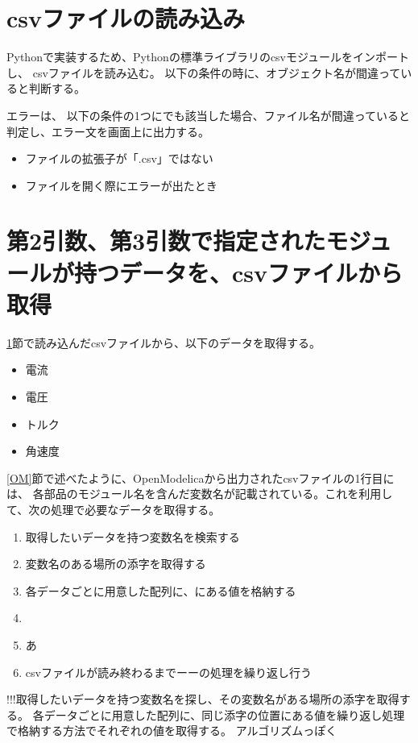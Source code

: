 \section{csvファイルの読み込み}\label{csvfairu}
Pythonで実装するため、Pythonの標準ライブラリのcsvモジュールをインポートし、
csvファイルを読み込む。
以下の条件の時に、オブジェクト名が間違っていると判断する。

エラーは、
以下の条件の1つにでも該当した場合、ファイル名が間違っていると判定し、エラー文を画面上に出力する。
\begin{itemize}
    \item ファイルの拡張子が「.csv」ではない
    \item ファイルを開く際にエラーが出たとき
\end{itemize}

\section{第2引数、第3引数で指定されたモジュールが持つデータを、csvファイルから取得}\label{syutoku_data}
\ref{csvfairu}節で読み込んだcsvファイルから、以下のデータを取得する。

\begin{itemize}
    \item 電流
    \item 電圧
    \item トルク
    \item 角速度
\end{itemize}

\ref{OM}節で述べたように、OpenModelicaから出力されたcsvファイルの1行目には、
各部品のモジュール名を含んだ変数名が記載されている。これを利用して、次の処理で必要なデータを取得する。

\begin{enumerate}
    \item 取得したいデータを持つ変数名を検索する
    \item 変数名のある場所の添字を取得する
    \item 各データごとに用意した配列に、にある値を格納する
    \item 
    \item あ
    \item csvファイルが読み終わるまでーーの処理を繰り返し行う
\end{enumerate}
!!!取得したいデータを持つ変数名を探し、その変数名がある場所の添字を取得する。
各データごとに用意した配列に、同じ添字の位置にある値を繰り返し処理で格納する方法でそれぞれの値を取得する。
アルゴリズムっぽく


